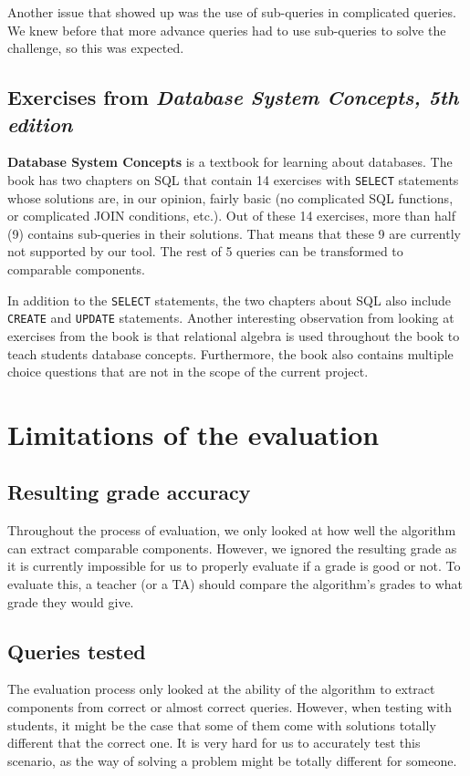 Another issue that showed up was the use of sub-queries in complicated queries. We knew before that more advance queries had to use sub-queries to solve the challenge, so this was expected.

\subsection{Exercises from \textit{Database System Concepts, 5th edition}}

\textbf{Database System Concepts} is a textbook for learning about databases. The book has two chapters on SQL that contain 14 exercises with \texttt{SELECT} statements whose solutions are, in our opinion, fairly basic (no complicated SQL functions, or complicated JOIN conditions, etc.). Out of these 14 exercises, more than half (9) contains sub-queries in their solutions. That means that these 9 are currently not supported by our tool. The rest of 5 queries can be transformed to comparable components.

In addition to the \texttt{SELECT} statements, the two chapters about SQL also include \texttt{CREATE} and \texttt{UPDATE} statements. Another interesting observation from looking at exercises from the book is that relational algebra is used throughout the book to teach students database concepts. Furthermore, the book also contains multiple choice questions that are not in the scope of the current project.

\section{Limitations of the evaluation}
\subsection{Resulting grade accuracy}
Throughout the process of evaluation, we only looked at how well the algorithm can extract comparable components. However, we ignored the resulting grade as it is currently impossible for us to properly evaluate if a grade is good or not. To evaluate this, a teacher (or a TA) should compare the algorithm's grades to what grade they would give.

\subsection{Queries tested}
The evaluation process only looked at the ability of the algorithm to extract components from correct or almost correct queries. However, when testing with students, it might be the case that some of them come with solutions totally different that the correct one. It is very hard for us to accurately test this scenario, as the way of solving a problem might be totally different for someone.

